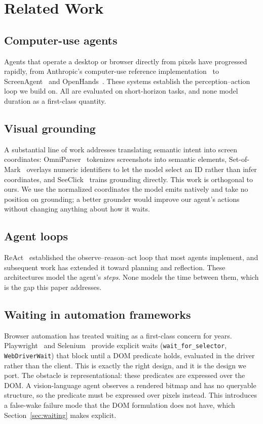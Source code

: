 \documentclass[conference]{IEEEtran}
\begin{document}
\section{Related Work}

\subsection{Computer-use agents}
Agents that operate a desktop or browser directly from pixels have progressed
rapidly, from Anthropic's computer-use reference implementation~\cite{anthropic}
to ScreenAgent~\cite{screenagent} and OpenHands~\cite{openhands}. These systems
establish the perception--action loop we build on. All are evaluated on
short-horizon tasks, and none model duration as a first-class quantity.

\subsection{Visual grounding}
A substantial line of work addresses translating semantic intent into screen
coordinates: OmniParser~\cite{omniparser} tokenizes screenshots into semantic
elements, Set-of-Mark~\cite{som} overlays numeric identifiers to let the model
select an ID rather than infer coordinates, and SeeClick~\cite{seeclick} trains
grounding directly. This work is orthogonal to ours. We use the normalized
coordinates the model emits natively and take no position on grounding; a better
grounder would improve our agent's actions without changing anything about how it
waits.

\subsection{Agent loops}
ReAct~\cite{react} established the observe--reason--act loop that most agents
implement, and subsequent work has extended it toward planning and reflection.
These architectures model the agent's \emph{steps}. None models the time between
them, which is the gap this paper addresses.

\subsection{Waiting in automation frameworks}
Browser automation has treated waiting as a first-class concern for years.
Playwright~\cite{playwright} and Selenium~\cite{selenium} provide explicit waits
(\texttt{wait\_for\_selector}, \texttt{WebDriverWait}) that block until a DOM
predicate holds, evaluated in the driver rather than the client. This is exactly
the right design, and it is the design we port. The obstacle is representational:
these predicates are expressed over the DOM. A vision-language agent observes a
rendered bitmap and has no queryable structure, so the predicate must be
expressed over pixels instead. This introduces a false-wake failure mode that the
DOM formulation does not have, which Section~\ref{sec:waiting} makes explicit.
\end{document}
